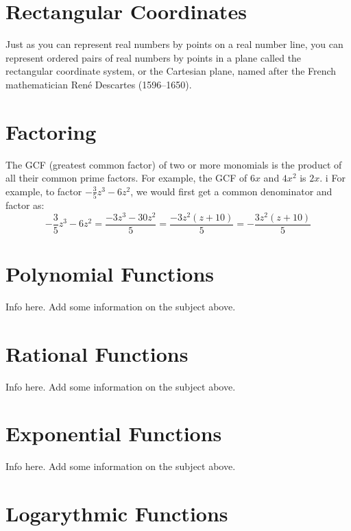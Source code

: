 \documentclass[12pt, letterpaper]{article}
\begin{document}
\section{Rectangular Coordinates}
Just as you can represent real numbers by points on a real number line, you can
represent ordered pairs of real numbers by points in a plane called the
rectangular coordinate system, or the Cartesian plane, named after the French
mathematician René Descartes (1596–1650).
\\

\section{Factoring}

The GCF (greatest common factor) of two or more monomials is the product of all 
their common prime factors. For example, the GCF of $6x$ and $4x^2$ is $2x$.
i
For example, to factor $-\frac{3}{5}z^3 - 6z^2$, we would first get a common
denominator and factor as: 
\[ -\frac{3}{5}z^3 - 6z^2 = \frac{-3z^3 - 30z^2}{5} =
\frac{-3z^2(z + 10)}{5} = -\frac{3z^2(z + 10)}{5}\]

\section{Polynomial Functions}

Info here. Add some information on the subject above. 

\section{Rational Functions}

Info here. Add some information on the subject above. 

\section{Exponential Functions}

Info here. Add some information on the subject above. 

\section{Logarythmic Functions}
\end{document}
